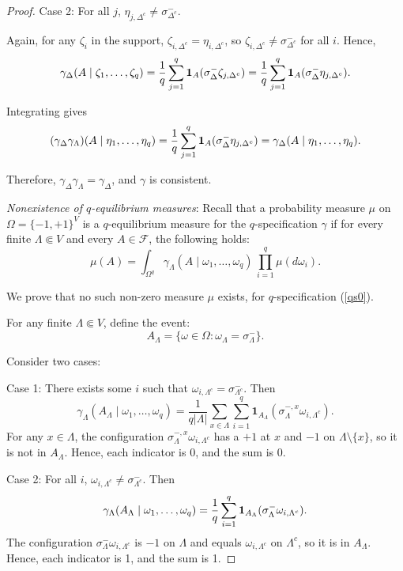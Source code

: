 \documentclass[11pt,reqno]{amsart}
\numberwithin{equation}{section} \setcounter{tocdepth}{1}
\begin{document}
\begin{proof}
Case 2: For all $j$, $\eta_{j,\Delta^c} \neq \sigma^-_{\Delta^c}$.


Again, for any $\zeta_i$ in the support, $\zeta_{i,\Delta^c} = \eta_{i,\Delta^c}$, so $\zeta_{i,\Delta^c} \neq \sigma^-_{\Delta^c}$ for all $i$. Hence,
$$
\gamma_\Delta(A \mid \zeta_1, \dots, \zeta_q) = {1\over q}\sum_{j=1}^q \mathbf{1}_A(\sigma^-_\Delta \zeta_{j,\Delta^c}) = {1\over q}\sum_{j=1}^q \mathbf{1}_A(\sigma^-_\Delta \eta_{j,\Delta^c}).
$$

Integrating gives
$$
(\gamma_\Delta \gamma_\Lambda)(A \mid \eta_1, \dots, \eta_q) = {1\over q}\sum_{j=1}^q \mathbf{1}_A(\sigma^-_\Delta \eta_{j,\Delta^c})=\gamma_\Delta(A \mid \eta_1, \dots, \eta_q).
$$

Therefore, $\gamma_\Delta \gamma_\Lambda = \gamma_\Delta$, and $\gamma$ is consistent.

{\it Nonexistence of $q$-equilibrium measures}: 
Recall that a probability measure $\mu$ on $\Omega = \{-1, +1\}^V$ is a $ q $-equilibrium measure
for the $ q $-specification $\gamma$ if for every finite $\Lambda \Subset V$ and every $A \in \mathcal{F}$, 
the following holds:
\begin{equation}\label{s0}
\mu(A) = \int_{\Omega^q} \gamma_\Lambda(A \mid \omega_1, \dots, \omega_q) \, \prod_{i=1}^q\mu(d\omega_i).
\end{equation}

We prove that no such non-zero measure $\mu$ exists, for $q$-specification (\ref{qs0}).

For any finite $\Lambda \Subset V$, define the event:
$$
A_\Lambda = \{ \omega \in \Omega: \omega_\Lambda = \sigma^-_\Lambda \}.
$$

Consider two cases:

Case 1: There exists some $i$ such that $\omega_{i,\Lambda^c} = \sigma^-_{\Lambda^c}$.  
  Then  
  $$
  \gamma_\Lambda(A_\Lambda \mid \omega_1, \dots, \omega_q) = \frac{1}{q|\Lambda|} \sum_{x \in \Lambda} \sum_{i=1}^q \mathbf{1}_{A_\Lambda}(\sigma_\Lambda^{-,x} \omega_{i,\Lambda^c}).
  $$  
  For any $x \in \Lambda$, the configuration $\sigma_\Lambda^{-,x} \omega_{i,\Lambda^c}$ has a $+1$ at $x$ and $-1$ on $\Lambda \setminus \{x\}$, so it is not in $A_\Lambda$. Hence, each indicator is 0, and the sum is 0.

Case 2: For all $i$, $\omega_{i,\Lambda^c} \neq \sigma^-_{\Lambda^c}$.  
  Then  
  $$
  \gamma_\Lambda(A_\Lambda \mid \omega_1, \dots, \omega_q) ={1\over q} \sum_{i=1}^q \mathbf{1}_{A_\Lambda}(\sigma^-_\Lambda \omega_{i,\Lambda^c}).
  $$  
  The configuration $\sigma^-_\Lambda \omega_{i,\Lambda^c}$ is $-1$ on $\Lambda$ and equals $\omega_{i,\Lambda^c}$ on $\Lambda^c$, so it is in $A_\Lambda$. Hence, each indicator is 1, and the sum is 1.


\end{proof}
\end{document}
